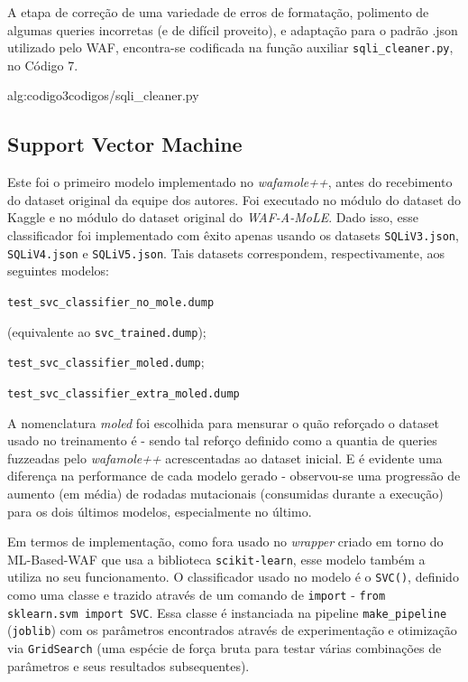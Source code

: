A etapa de correção de uma variedade de erros de formatação, polimento de algumas queries incorretas (e de difícil proveito), e adaptação para o padrão .json utilizado pelo WAF, encontra-se codificada na função auxiliar \verb+sqli_cleaner.py+, no Código 7.


\label{sec:codigos:sqli_cleaner}
 {alg:codigo3}{codigos/sqli_cleaner.py}
\bigskip


\subsection{Support Vector Machine}
Este foi o primeiro modelo implementado no \textit{wafamole++}, antes do recebimento do dataset original da equipe dos autores. Foi executado no módulo do dataset do Kaggle e no módulo do dataset original do \textit{WAF-A-MoLE}. Dado isso, esse classificador foi implementado com êxito apenas usando os datasets \verb+SQLiV3.json+, \verb+SQLiV4.json+ e \verb+SQLiV5.json+. Tais datasets correspondem, respectivamente, aos seguintes modelos:
\begin{alineas}
\item \verb+test_svc_classifier_no_mole.dump+

(equivalente ao \verb+svc_trained.dump+);
\item \verb+test_svc_classifier_moled.dump+;
\item \verb+test_svc_classifier_extra_moled.dump+ 
\end{alineas}

A nomenclatura \textit{moled} foi escolhida para mensurar o quão reforçado o dataset usado no treinamento é - sendo tal reforço definido como a quantia de queries fuzzeadas pelo \textit{wafamole++} acrescentadas ao dataset inicial. E é evidente uma diferença na performance de cada modelo gerado - observou-se uma progressão de aumento (em média) de rodadas mutacionais (consumidas durante a execução) para os dois últimos modelos, especialmente no último.

Em termos de implementação, como fora usado no \textit{wrapper} criado em torno do ML-Based-WAF que usa a biblioteca \verb+scikit-learn+, esse modelo também a utiliza no seu funcionamento. O classificador usado no modelo é o \verb+SVC()+, definido como uma classe e trazido através de um comando de \verb+import+ - \verb+from sklearn.svm import SVC+. Essa classe é instanciada na pipeline \verb+make_pipeline+ (\verb+joblib+) com os parâmetros encontrados através de experimentação e otimização via \verb+GridSearch+ (uma espécie de força bruta para testar várias combinações de parâmetros e seus resultados subsequentes).

